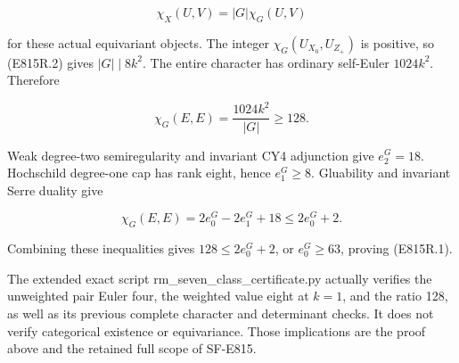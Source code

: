 \[
 \chi_X(U,V)=|G|\chi_G(U,V)
\]

for these actual equivariant objects. The integer
\(\chi_G(U_{X_0},U_{Z_+})\) is positive, so (E815R.2) gives
\(|G|\mid8k^2\). The entire character has ordinary self-Euler
\(1024k^2\). Therefore

\[
 \chi_G(E,E)=\frac{1024k^2}{|G|}\ge128.
\]

Weak degree-two semiregularity and invariant CY4 adjunction give
\(e_2^G=18\). Hochschild degree-one cap has rank eight, hence
\(e_1^G\ge8\). Gluability and invariant Serre duality give

\[
 \chi_G(E,E)=2e_0^G-2e_1^G+18\le2e_0^G+2.
\]

Combining these inequalities gives \(128\le2e_0^G+2\), or
\(e_0^G\ge63\), proving (E815R.1).

The extended exact script rm\_seven\_class\_certificate.py actually
verifies the unweighted pair Euler four, the weighted value eight at
\(k=1\), and the ratio 128, as well as its previous complete character
and determinant checks. It does not verify categorical existence or
equivariance. Those implications are the proof above and the retained
full scope of SF-E815.
